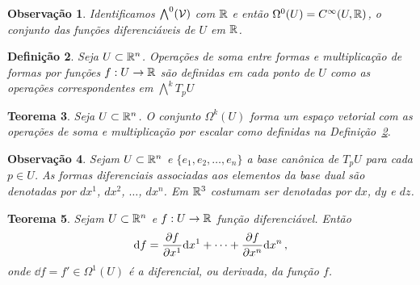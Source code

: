 \documentclass[a4paper,12pt]{extreport}
\newtheorem{mydef}{Definição}
\newtheorem{myobs}[mydef]{Observação}
\newtheorem{myteo}[mydef]{Teorema}
\newif\ifspacesbetweentheos
\newcommand{\theospace}[1]{
\ifspacesbetweentheos
  \vspace{#1}
\fi
}
\newcommand{\theonewpage}{
\ifspacesbetweentheos
  \newpage
\fi
}
\begin{document}
\begin{myobs}
  Identificamos $\bigwedge^0(\mathcal{V})$ com $\mathbb{R}$
  e então $\Omega^0(U) = C^\infty(U, \mathbb{R})$,
  o conjunto das funções diferenciáveis de $U$ em $\mathbb{R}$.
\end{myobs}


\theospace{3cm}


\begin{mydef}\label{def:opera_formas}
  Seja $U \subset \mathbb{R}^n$.
  Operações de soma entre formas
  e multiplicação de formas por funções $f:U \to \mathbb{R}$
  são definidas em cada ponto de $U$ como as operações correspondentes
  em $\bigwedge^k T_p U$
\end{mydef}


\begin{myteo}
  Seja $U \subset \mathbb{R}^n$.
  O conjunto $\Omega^k(U)$ forma um espaço vetorial 
  com as operações de soma e multiplicação por escalar como definidas
  na Definição~\ref{def:opera_formas}.
\end{myteo}


\theospace{3cm}


\begin{myobs}
  Sejam $U \subset \mathbb{R}^n$ e $\{e_1, e_2, \dots, e_n\}$ a base canônica de
  $T_pU$ para cada $p \in U$.
  As formas diferenciais associadas aos elementos da base dual
  são denotadas por $dx^1$, $dx^2$, $\dots$, $dx^n$.
  Em $\mathbb{R}^3$ costumam ser denotadas por $dx$, $dy$ e $dz$.
\end{myobs}



\begin{myteo}
  Sejam $U \subset \mathbb{R}^n$ e $f: U \to \mathbb{R}$ função diferenciável.
  Então
  \begin{equation}
    \dd f = \pdv{f}{x^1} \dd x^1
    + \cdots
    + \pdv{f}{x^n} \dd x^n\,,
  \end{equation}
  onde $\dd f = f' \in \Omega^1(U)$ é a diferencial,
  ou derivada, da função $f$.
\end{myteo}


\theonewpage
\end{document}
